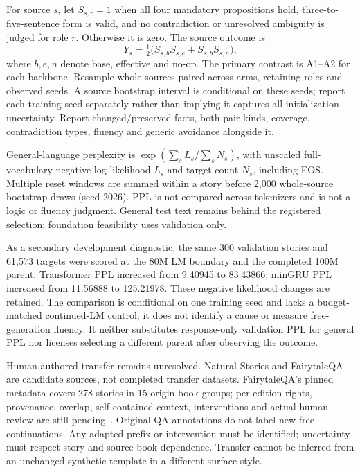 For source $s$, let $S_{s,r}=1$ when all four mandatory propositions hold,
three-to-five-sentence form is valid, and no contradiction or unresolved
ambiguity is judged for role $r$. Otherwise it is zero. The source outcome is
\[
Y_s=\tfrac12\bigl(S_{s,b}S_{s,e}+S_{s,b}S_{s,n}\bigr),
\]
where $b,e,n$ denote base, effective and no-op. The primary contrast is A1--A2
for each backbone. Resample whole sources paired across arms, retaining roles
and observed seeds. A source bootstrap interval is conditional on these seeds;
report each training seed separately rather than implying it captures all
initialization uncertainty. Report changed/preserved facts, both pair kinds,
coverage, contradiction types, fluency and generic avoidance alongside it.

General-language perplexity is $\exp(\sum_s L_s/\sum_s N_s)$, with unscaled
full-vocabulary negative log-likelihood $L_s$ and target count $N_s$, including
EOS. Multiple reset windows are summed within a story before 2,000 whole-source
bootstrap draws (seed 2026). PPL is not compared across tokenizers and is not a
logic or fluency judgment. General test text remains behind the registered
selection; foundation feasibility uses validation only.

As a secondary development diagnostic, the same 300 validation stories and
61,573 targets were scored at the 80M LM boundary and the completed 100M
parent. Transformer PPL increased from 9.40945 to 83.43866; minGRU PPL increased
from 11.56888 to 125.21978. These negative likelihood changes are retained.
The comparison is conditional on one training seed and lacks a budget-matched
continued-LM control; it does not identify a cause or measure free-generation
fluency. It neither substitutes response-only validation PPL for general PPL
nor licenses selecting a different parent after observing the outcome.

Human-authored transfer remains unresolved. Natural Stories and FairytaleQA
are candidate sources, not completed transfer datasets. FairytaleQA's pinned
metadata covers 278 stories in 15 origin-book groups; per-edition rights,
provenance, overlap, self-contained context, interventions and actual human
review are still pending~\cite{fairytaleqa}. Original QA annotations do not label
new free continuations. Any adapted prefix or intervention must be identified;
uncertainty must respect story and source-book dependence. Transfer cannot be
inferred from an unchanged synthetic template in a different surface style.

